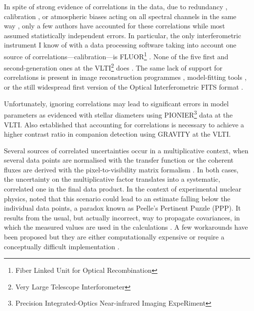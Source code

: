 \documentclass{pasa}
\begin{document}
In spite of strong evidence of correlations in the data, due to redundancy \citep[][in the case of closure phases]{MON07}, calibration \citep{PER03}, or atmospheric biases acting on all spectral channels in the same way \citep{LAW00}, only a few authors \citep{PER04,ABS06,BER06,LAC19,KAM20} have accounted for these correlations while most assumed statistically independent errors.  In particular, the only interferometric instrument I know of with a data processing software taking into account one source of correlations---calibration---is FLUOR\footnote{Fiber Linked Unit for Optical Recombination} \citep[at IOTA\footnote{Infrared and Optical Telescope Array}, then CHARA\footnote{Center for High Angular Resolution Array}, ][]{PER04}. None of the five first and second-generation ones at the VLTI\footnote{Very Large Telescope Interforometer} does \citep{AMBER,MIDI,PIONIER,GRAVITYpipe,MATISSEpipe}.  The same lack of support for correlations is present in image reconstruction programmes \citep[e.g. MIRA, see][]{THI08}, model-fitting tools \citep[e.g. Litpro, see][]{TAL08}, or the still widespread first version of the Optical Interferometric FITS format \citep[OIFITS v. 1,][]{OIFITS1}.

Unfortunately, ignoring correlations may lead to significant errors in model parameters as \citet{LAC19} evidenced with stellar diameters using PIONIER\footnote{Precision Integrated-Optics Near-infrared Imaging ExpeRiment} \citep{PIONIER} data at the VLTI. Also \citet{KAM20} established that accounting for correlations is necessary to achieve a higher contrast ratio in companion detection using GRAVITY \citep{GRAVITY} at the VLTI. 

Several sources of correlated uncertainties occur in a multiplicative context, when several data points are normalised with the transfer function \citep{PER03} or the coherent fluxes are derived with the pixel-to-visibility matrix formalism \citep{TAT07}.  In both cases, the uncertainty on the multiplicative factor translates into a systematic, correlated one in the final data product. In the context of experimental nuclear physics, \citet{PEE87} noted that this scenario could lead to an estimate falling below the individual data points, a paradox known as Peelle's Pertinent Puzzle (PPP). It results from the usual, but actually incorrect, way to propagate covariances, in which the measured values are used in the calculations \citep{DAG94,NEU12}.  A few workarounds have been proposed but they are either computationally expensive \citep[e.g. sampling of the posterior probability distribution for Bayesian analysis, see][]{NEU12} or require a conceptually difficult implementation \citep{BEC12,NIS14}.  
\end{document}
